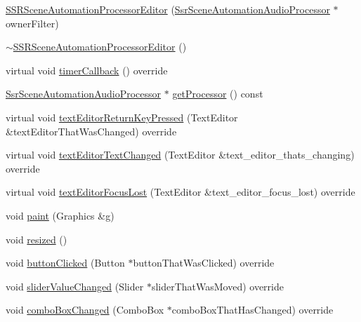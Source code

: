 \begin{DoxyCompactItemize}
\item 
\hyperlink{classSSRSceneAutomationProcessorEditor_a2e16ce434b03220226e85995e59108a7}{S\-S\-R\-Scene\-Automation\-Processor\-Editor} (\hyperlink{classSsrSceneAutomationAudioProcessor}{Ssr\-Scene\-Automation\-Audio\-Processor} $\ast$owner\-Filter)
\item 
\hyperlink{classSSRSceneAutomationProcessorEditor_a2354b99e8f07e09e482e285af34a8e8f}{$\sim$\-S\-S\-R\-Scene\-Automation\-Processor\-Editor} ()
\item 
virtual void \hyperlink{classSSRSceneAutomationProcessorEditor_a33986fcc98b7c16762b3b44e65747c7b}{timer\-Callback} () override
\item 
\hyperlink{classSsrSceneAutomationAudioProcessor}{Ssr\-Scene\-Automation\-Audio\-Processor} $\ast$ \hyperlink{classSSRSceneAutomationProcessorEditor_a05df0d6d92eccab2ecf4348d398322d8}{get\-Processor} () const 
\item 
virtual void \hyperlink{classSSRSceneAutomationProcessorEditor_ac63e209656a690feb7cd665d879e5cb7}{text\-Editor\-Return\-Key\-Pressed} (Text\-Editor \&text\-Editor\-That\-Was\-Changed) override
\item 
virtual void \hyperlink{classSSRSceneAutomationProcessorEditor_a7363a103f08f6086ea9df34b0b213400}{text\-Editor\-Text\-Changed} (Text\-Editor \&text\-\_\-editor\-\_\-thats\-\_\-changing) override
\item 
virtual void \hyperlink{classSSRSceneAutomationProcessorEditor_a3993f81b3245699374690cb283923de8}{text\-Editor\-Focus\-Lost} (Text\-Editor \&text\-\_\-editor\-\_\-focus\-\_\-lost) override
\item 
void \hyperlink{classSSRSceneAutomationProcessorEditor_a568b893d27495651c28b289ea6b11627}{paint} (Graphics \&g)
\item 
void \hyperlink{classSSRSceneAutomationProcessorEditor_a252129267d3712d64721528ae43f1bbb}{resized} ()
\item 
void \hyperlink{classSSRSceneAutomationProcessorEditor_adcf4a91e6b61a505bca632d5a8abc26b}{button\-Clicked} (Button $\ast$button\-That\-Was\-Clicked) override
\item 
void \hyperlink{classSSRSceneAutomationProcessorEditor_af43fa2e2f4e687eaba1e61262a5f3eaf}{slider\-Value\-Changed} (Slider $\ast$slider\-That\-Was\-Moved) override
\item 
void \hyperlink{classSSRSceneAutomationProcessorEditor_a4a5ba88f65a9c5e0f24540f76899b81b}{combo\-Box\-Changed} (Combo\-Box $\ast$combo\-Box\-That\-Has\-Changed) override
\end{DoxyCompactItemize}
